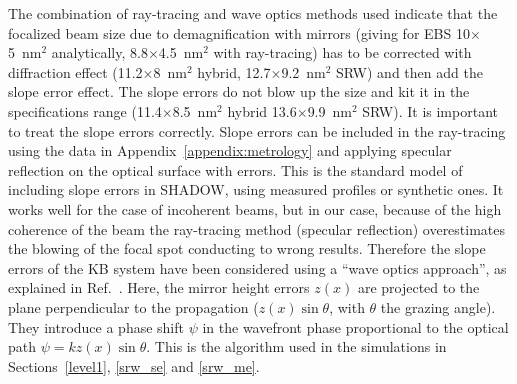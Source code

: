 \documentclass{iucr}              %
\newcommand{\inred}[1]{{\color{red}#1}}
\begin{document}
The combination of ray-tracing and wave optics methods used indicate that the focalized beam size due to  demagnification with mirrors (giving for EBS 10$\times$5~nm$^2$ analytically, 8.8$\times$4.5~nm$^2$ with ray-tracing) has to be corrected with diffraction effect (11.2$\times$8~nm$^2$ hybrid, 12.7$\times$9.2~nm$^2$ SRW) and then add the slope error effect. The slope errors do not blow up the size and kit it in the specifications range (11.4$\times$8.5~nm$^2$ hybrid \inred{13.6$\times$9.9~nm$^2$ SRW}). It is important to treat the slope errors correctly. Slope errors can be included in the ray-tracing using the data in Appendix~\ref{appendix:metrology} and applying specular reflection on the optical surface with errors. This is the standard model of including slope errors in SHADOW, using measured profiles or synthetic ones. It works well for the case of incoherent beams, but in our case, because of the high coherence of the beam the ray-tracing method (specular reflection) overestimates the blowing of the focal spot conducting to wrong results. Therefore the slope errors of the KB system have been considered using a ``wave optics approach'', as explained in Ref.~\cite{hybrid}. Here, the mirror height errors $z(x)$ are projected to the plane perpendicular to the propagation ($z(x) \sin \theta$, with $\theta$ the grazing angle). They introduce a phase shift $\psi$ in the wavefront phase proportional to the optical path $\psi = k z(x) \sin \theta $. This is the algorithm used in the simulations in Sections~\ref{level1}, \ref{srw_se} and \ref{srw_me}.   


\end{document}
